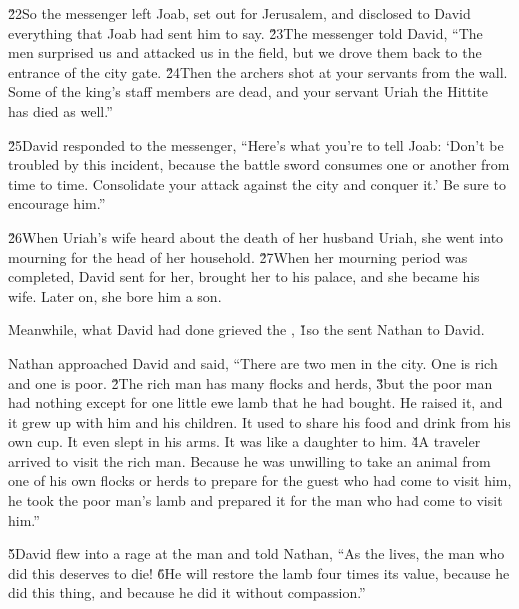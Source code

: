 \v{22}So the messenger left Joab, set out for Jerusalem, and disclosed to David everything that Joab had sent him to say. \v{23}The messenger told David, ``The men surprised us and attacked us in the field, but we drove them back to the entrance of the city gate. \v{24}Then the archers shot at your servants from the wall. Some of the king's staff members are dead, and your servant Uriah the Hittite has died as well.''

\v{25}David responded to the messenger, ``Here's what you're to tell Joab: `Don't be troubled by this incident, because the battle sword consumes one or another from time to time. Consolidate your attack against the city and conquer it.' Be sure to encourage him.''

\v{26}When Uriah's wife heard about the death of her husband Uriah, she went into mourning for the head of her household. \v{27}When her mourning period was completed, David sent for her, brought her to his palace, and she became his wife. Later on, she bore him a son.

Meanwhile, what David had done grieved the ,
\v{1}so the  sent Nathan to David.

Nathan approached David and said, ``There are two men in the city. One is rich and one is poor. \v{2}The rich man has many flocks and herds, \v{3}but the poor man had nothing except for one little ewe lamb that he had bought. He raised it, and it grew up with him and his children. It used to share his food and drink from his own cup. It even slept in his arms. It was like a daughter to him. \v{4}A traveler arrived to visit the rich man. Because he was unwilling to take an animal from one of his own flocks or herds to prepare for the guest who had come to visit him, he took the poor man's lamb and prepared it for the man who had come to visit him.''

\v{5}David flew into a rage at the man and told Nathan, ``As the  lives, the man who did this deserves to die! \v{6}He will restore the lamb four times its value, because he did this thing, and because he did it without compassion.''

